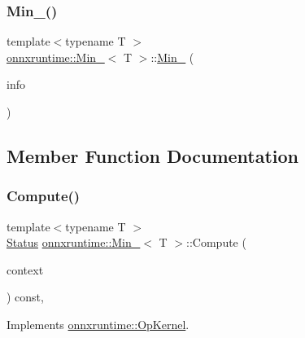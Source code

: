 \subsubsection{\texorpdfstring{Min\+\_()}{Min\_8()}}
{\footnotesize\ttfamily template$<$typename T $>$ \\
\mbox{\hyperlink{classonnxruntime_1_1Min__8}{onnxruntime\+::\+Min\+\_}}$<$ T $>$\+::\mbox{\hyperlink{classonnxruntime_1_1Min__8}{Min\+\_}} (\begin{DoxyParamCaption}\item[{const \mbox{\hyperlink{classonnxruntime_1_1OpKernelInfo}{Op\+Kernel\+Info}} \&}]{info }\end{DoxyParamCaption})\hspace{0.3cm}{\ttfamily [inline]}}



\subsection{Member Function Documentation}
\mbox{\label{classonnxruntime_1_1Min__8_a3622550b5f98e65523ae4bc61b87ac1d}} 
\subsubsection{\texorpdfstring{Compute()}{Compute()}\hspace{0.1cm}{\footnotesize\ttfamily [1/2]}}
{\footnotesize\ttfamily template$<$typename T $>$ \\
\mbox{\hyperlink{classonnxruntime_1_1common_1_1Status}{Status}} \mbox{\hyperlink{classonnxruntime_1_1Min__8}{onnxruntime\+::\+Min\+\_}}$<$ T $>$\+::Compute (\begin{DoxyParamCaption}\item[{\mbox{\hyperlink{classonnxruntime_1_1OpKernelContext}{Op\+Kernel\+Context}} $\ast$}]{context }\end{DoxyParamCaption}) const\hspace{0.3cm}{\ttfamily [override]}, {\ttfamily [virtual]}}



Implements \mbox{\hyperlink{classonnxruntime_1_1OpKernel_a9eca8656a78b1b3ab9d3351a12798650}{onnxruntime\+::\+Op\+Kernel}}.

\mbox{\label{classonnxruntime_1_1Min__8_a519e26ba4e9ddc6074919556affc1e71}} 
